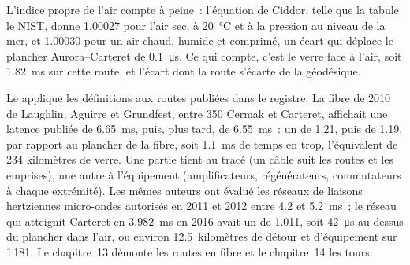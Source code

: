 L'indice propre de l'air compte à peine~: l'équation de Ciddor, telle que la tabule le NIST, donne 1.00027 pour l'air sec, à \qty{20}{\celsius} et
à la pression au niveau de la mer, et 1.00030 pour un air chaud, humide et comprimé, un écart qui déplace le plancher Aurora--Carteret de \qty{0.1}{\micro\second}.
Ce qui compte, c'est le verre face à l'air, soit \qty{1.82}{\milli\second} sur cette route, et l'écart dont la route s'écarte de la géodésique.

\label{lst:nw:the-north-american-map:floor}

Le  applique les définitions aux routes publiées dans le registre. La fibre de 2010 de Laughlin, Aguirre et Grundfest,
entre 350 Cermak et Carteret, affichait une latence publiée de \qty{6.65}{\milli\second}, puis, plus tard, de \qty{6.55}{\milli\second}~: un  de 1.21,
puis de 1.19, par rapport au plancher de la fibre, soit \qty{1.1}{\milli\second} de temps en trop, l'équivalent de 234 kilomètres de verre. Une partie tient au tracé (un
câble suit les routes et les emprises), une autre à l'équipement (amplificateurs, régénérateurs, commutateurs à chaque extrémité). Les mêmes auteurs ont évalué les
réseaux de liaisons hertziennes micro-ondes autorisés en 2011 et 2012 entre 4.2 et \qty{5.2}{\milli\second}~; le réseau qui atteignit Carteret en \qty{3.982}{\milli\second}
en 2016 avait un  de 1.011, soit \qty{42}{\micro\second} au-dessus du plancher dans l'air, ou environ 12.5~kilomètres de détour et d'équipement sur
1\,181. Le chapitre~13 démonte les routes en fibre et le chapitre~14 les tours.

